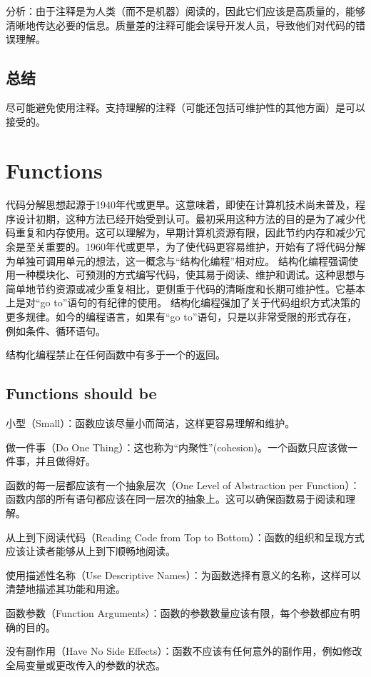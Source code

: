 \documentclass[]{ctexbook}
\begin{document}
分析：由于注释是为人类（而不是机器）阅读的，因此它们应该是高质量的，能够清晰地传达必要的信息。质量差的注释可能会误导开发人员，导致他们对代码的错误理解。

\section{总结}
尽可能避免使用注释。支持理解的注释（可能还包括可维护性的其他方面）是可以接受的。

\chapter{Functions}

代码分解思想起源于1940年代或更早。这意味着，即使在计算机技术尚未普及，程序设计初期，这种方法已经开始受到认可。最初采用这种方法的目的是为了减少代码重复和内存使用。这可以理解为，早期计算机资源有限，因此节约内存和减少冗余是至关重要的。1960年代或更早，为了使代码更容易维护，开始有了将代码分解为单独可调用单元的想法，这一概念与“结构化编程”相对应。
结构化编程强调使用一种模块化、可预测的方式编写代码，使其易于阅读、维护和调试。这种思想与简单地节约资源或减少重复相比，更侧重于代码的清晰度和长期可维护性。它基本上是对“go to”语句的有纪律的使用。
结构化编程强加了关于代码组织方式决策的更多规律。如今的编程语言，如果有“go to”语句，只是以非常受限的形式存在，例如条件、循环语句。

结构化编程禁止在任何函数中有多于一个的返回。

\section{Functions should be}
小型（Small）：函数应该尽量小而简洁，这样更容易理解和维护。

做一件事（Do One Thing）：这也称为“内聚性”(cohesion)。一个函数只应该做一件事，并且做得好。

函数的每一层都应该有一个抽象层次（One Level of Abstraction per Function）：函数内部的所有语句都应该在同一层次的抽象上。这可以确保函数易于阅读和理解。

从上到下阅读代码（Reading Code from Top to Bottom）：函数的组织和呈现方式应该让读者能够从上到下顺畅地阅读。

使用描述性名称（Use Descriptive Names）：为函数选择有意义的名称，这样可以清楚地描述其功能和用途。

函数参数（Function Arguments）：函数的参数数量应该有限，每个参数都应有明确的目的。

没有副作用（Have No Side Effects）：函数不应该有任何意外的副作用，例如修改全局变量或更改传入的参数的状态。
\end{document}
